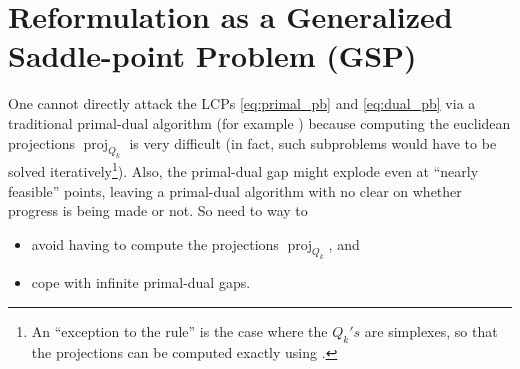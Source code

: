 \documentclass[envcountsame]{llncs} %
\DeclareMathOperator{\proj}{proj}
\begin{document}
\section{Reformulation as a Generalized Saddle-point Problem (GSP)}
\label{sec:gsp}
One cannot directly attack the LCPs \eqref{eq:primal_pb} and
\eqref{eq:dual_pb} via a traditional primal-dual algorithm
(for example \cite{chambolle2010,chambolle2014ergodic}) because
computing the euclidean projections $\proj_{Q_k}$ is very difficult
(in fact, such subproblems would have to be solved
iteratively\footnote{An ``exception to the rule'' is the case where
  the $Q_k's$ are simplexes, so that the projections can be computed
  exactly using \cite{duchi2008efficient}.}). Also,
the primal-dual gap might explode even at ``nearly feasible'' points,
leaving a primal-dual algorithm with no clear on whether progress is
being made or not. So need to way to
\begin{itemize}
\item avoid having to compute the projections $\proj_{Q_k}$, and
\item cope  with infinite primal-dual gaps.
\end{itemize}
\end{document}
